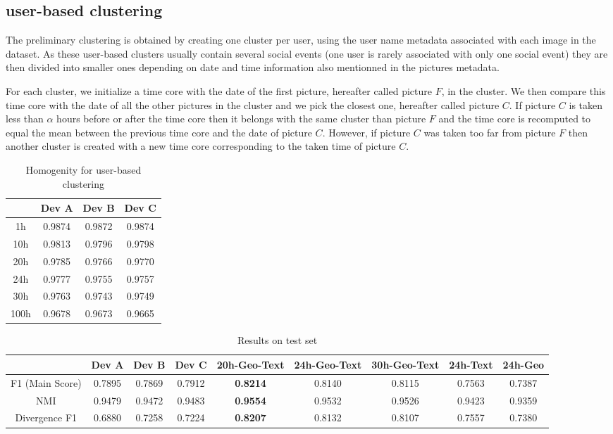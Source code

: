 \documentclass{acm_proc_article-me11_tweaked}
\begin{document}
\subsection{user-based clustering}\label{preliminary}
The preliminary clustering is obtained by creating one cluster per user, using the user name metadata associated with each image in the dataset.
As these user-based clusters usually contain several social events (one user is rarely associated with only one social event) they are then divided into smaller ones depending on date and time information also mentionned in the pictures metadata.

For each cluster, we initialize a time core with the date of the first picture, hereafter called picture $F$, in the cluster. We then compare this time core with the date of all the other pictures in the cluster and we pick the closest one, hereafter called picture $C$. If picture $C$ is taken less than $\alpha$ hours before or after the time core then it belongs with the same cluster than picture $F$ and the time core is recomputed to equal the mean between the previous time core and the date of picture $C$. However, if picture $C$ was taken too far from picture $F$ then another cluster is created with a new time core corresponding to the taken time of picture $C$. 

\begin{table}[t]
\centering
\caption{Homogenity for user-based clustering}\label{t:preliminary}
\begin{tabular}{|c|c|c|c|} \hline
 & \textbf{Dev A} & \textbf{Dev B} & \textbf{Dev C}\\\hline
1h &  0.9874 & 0.9872 & 0.9874\\\hline
10h &  0.9813  & 0.9796 & 0.9798\\\hline
20h &  0.9785  & 0.9766 & 0.9770\\\hline
24h &  0.9777  & 0.9755 & 0.9757\\\hline
30h & 0.9763   & 0.9743 & 0.9749\\\hline
100h & 0.9678 & 0.9673 & 0.9665\\\hline
\end{tabular}
\end{table}

\begin{table*}[t]
\centering
\caption{Results on test set}\label{t:test}
\begin{tabular}{|c||c|c|c||c|c|c|c|c|} \hline
 & Dev A & Dev B & Dev C & 20h-Geo-Text & 24h-Geo-Text & 30h-Geo-Text & 24h-Text & 24h-Geo\\\hline
F1 (Main Score) &0.7895 &0.7869 & 0.7912& \textbf{0.8214} & 0.8140 & 0.8115 & 0.7563 & 0.7387\\\hline
NMI & 0.9479&0.9472 & 0.9483& \textbf{0.9554} & 0.9532 & 0.9526 & 0.9423 & 0.9359\\\hline
Divergence F1 & 0.6880 &0.7258 & 0.7224& \textbf{0.8207} & 0.8132 & 0.8107 & 0.7557 & 0.7380\\\hline
\end{tabular}
\end{table*}
\end{document}
